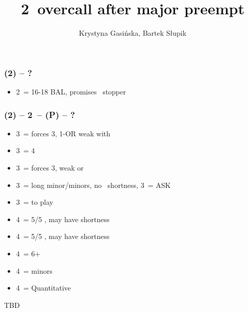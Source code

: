 \documentclass[12pt, a4paper]{article}
\title{2\ntx\ overcall after major preempt}
\author{Krystyna Gasińska, Bartek Słupik}
\begin{document}
\maketitle


\subsubsection*{(2\majs) -- ?}
\begin{itemize}
    \item 2\nt\ = 16-18 BAL, promises \majs\ stopper
\end{itemize}

\subsubsection*{(2\hearts) -- 2\ntx\ -- (P) -- ?}
\begin{itemize}
    \item 3\clubs\ = forces 3\diams, 1-\hearts \gf OR weak with \diams
    \item 3\diams\ = 4\spades\ \gf
    \item 3\hearts\ = forces 3\spades, weak or \gf
    \item 3\spades\ = long minor/minors, no \hearts\ shortness, 3\nt\ = ASK
    \item 3\nt\ = to play
    \item 4\clubs\ = 5/5 \clubs\spades, may have shortness
    \item 4\diams\ = 5/5 \diams\spades, may have shortness
    \item 4\hearts\ = 6+\spades
    \item 4\spades\ = minors
    \item 4\nt\ = Quantitative
\end{itemize}

TBD

\end{document}
